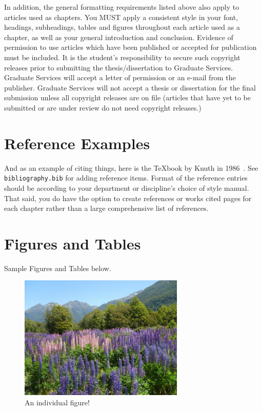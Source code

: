In addition, the general formatting requirements listed above also apply to articles used as chapters. You MUST apply a consistent style in your font, headings, subheadings, tables and figures throughout each article used as a chapter, as well as your general introduction and conclusion. Evidence of permission to use articles which have been published or accepted for publication must be included. It is the student's responsibility to secure such copyright releases prior to submitting the thesis/dissertation to Graduate Services. Graduate Services will accept a letter of permission or an e-mail from the publisher. Graduate Services will not accept a thesis or dissertation for the final submission unless all copyright releases are on file (articles that have yet to be submitted or are under review do not need copyright releases.) 





\section{Reference Examples}
\label{sec:reference_examples}

And as an example of citing things, here is the \TeX book by Knuth in 1986~\cite{knuth1986texbook}. See \verb|bibliography.bib| for adding reference items. Format of the reference entries should be according to your department or discipline's choice of style manual. That said, you do have the option to create references or works cited pages for each chapter rather than a large comprehensive list of references.


\section{Figures and Tables}
\label{sec:figures_tables}

Sample Figures and Tables below.

\begin{figure}[H]
	\centering
	\includegraphics[width=0.7\textwidth]{./Plots/nature.jpg}
	\caption{An individual figure!}
\end{figure}
        
